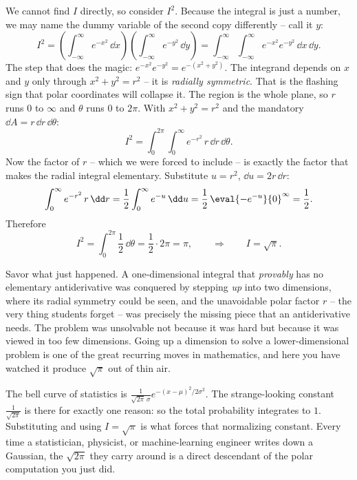 \begin{example}[$\int_{-\infty}^\infty e^{-x^2}\,\dd x=\sqrt\pi$]
\label{ch34:ex-gauss}
We cannot find $I$ directly, so consider $I^2$. Because the integral is just a
number, we may name the dummy variable of the second copy differently -- call it
$y$:
\[
  I^2=\left(\int_{-\infty}^\infty e^{-x^2}\,\dd x\right)
      \left(\int_{-\infty}^\infty e^{-y^2}\,\dd y\right)
     =\int_{-\infty}^\infty\!\int_{-\infty}^\infty e^{-x^2}e^{-y^2}\,\dd x\,\dd y .
\]
The step that does the magic: $e^{-x^2}e^{-y^2}=e^{-(x^2+y^2)}$. The integrand
depends on $x$ and $y$ only through $x^2+y^2=r^2$ -- it is \emph{radially
symmetric}. That is the flashing sign that polar coordinates will collapse it.
The region is the whole plane, so $r$ runs $0$ to $\infty$ and $\theta$ runs $0$
to $2\pi$. With $x^2+y^2=r^2$ and the mandatory $\dd A=r\,\dd r\,\dd\theta$:
\[
  I^2=\int_0^{2\pi}\!\int_0^\infty e^{-r^2}\,r\,\dd r\,\dd\theta .
\]
Now the factor of $r$ -- which we were forced to include -- is exactly the factor
that makes the radial integral elementary. Substitute $u=r^2$, $\dd u=2r\,\dd r$:
\[
  \int_0^\infty e^{-r^2}\,r\,\dd r
  =\frac12\int_0^\infty e^{-u}\,\dd u
  =\frac12\,\eval{-e^{-u}}{0}^{\infty}=\frac12 .
\]
Therefore
\[
  I^2=\int_0^{2\pi}\frac12\,\dd\theta=\frac12\cdot 2\pi=\pi,
  \qquad\Longrightarrow\qquad
  I=\sqrt\pi .
\]
\end{example}

\begin{aestheticbox}
Savor what just happened. A one-dimensional integral that \emph{provably} has no
elementary antiderivative was conquered by stepping \emph{up} into two
dimensions, where its radial symmetry could be seen, and the unavoidable polar
factor $r$ -- the very thing students forget -- was precisely the missing piece
that an antiderivative needs. The problem was unsolvable not because it was
hard but because it was viewed in too few dimensions. Going up a dimension to
solve a lower-dimensional problem is one of the great recurring moves in
mathematics, and here you have watched it produce $\sqrt\pi$ out of thin air.
\end{aestheticbox}

\begin{applicationbox}
The bell curve of statistics is $\frac{1}{\sqrt{2\pi}\,\sigma}
e^{-(x-\mu)^2/2\sigma^2}$. The strange-looking constant $\frac{1}{\sqrt{2\pi}}$
is there for exactly one reason: so the total probability integrates to $1$.
Substituting and using $I=\sqrt\pi$ is what forces that normalizing constant.
Every time a statistician, physicist, or machine-learning engineer writes down a
Gaussian, the $\sqrt{2\pi}$ they carry around is a direct descendant of the polar
computation you just did.
\end{applicationbox}

